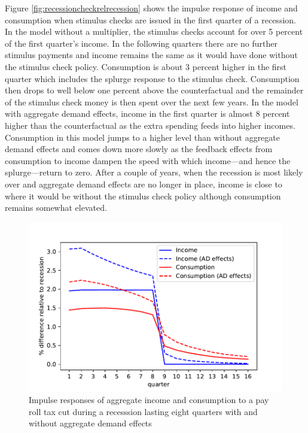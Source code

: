 \documentclass[../HAFiscal]{subfiles}
\begin{document}
Figure \ref{fig:recessioncheckrelrecession} shows the impulse response of income and consumption when stimulus checks are issued in the first quarter of a recession. In the model without a multiplier, the stimulus checks account for over 5 percent of the first quarter's income. In the following quarters there are no further stimulus payments and income remains the same as it would have done without the stimulus check policy. Consumption is about 3 percent higher in the first quarter which includes the splurge response to the stimulus check. Consumption then drops to well below one percent above the counterfactual and the remainder of the stimulus check money is then spent over the next few years. In the model with aggregate demand effects, income in the first quarter is almost 8 percent higher than the counterfactual as the extra spending feeds into higher incomes. Consumption in this model jumps to a higher level than without aggregate demand effects and comes down more slowly as the feedback effects from consumption to income dampen the speed with which income---and hence the splurge---return to zero. After a couple of years, when the recession is most likely over and aggregate demand effects are no longer in place, income is close to where it would be without the stimulus check policy although consumption remains somewhat elevated.

\begin{figure}
	\centering
	\includegraphics[width=0.8\linewidth]{Code/HA-Models/FromPandemicCode/Figures/recession_taxcut_relrecession}
	\caption{Impulse responses of aggregate income and consumption to a pay roll tax cut during a recesssion lasting eight quarters with and without aggregate demand effects}
	\label{fig:recessiontaxcutrelrecession}
\end{figure}
\end{document}
